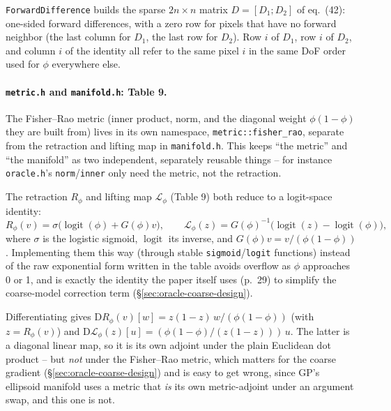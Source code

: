 \documentclass[11pt]{article}
\begin{document}
\texttt{ForwardDifference} builds the sparse $2n\times n$ matrix $D=[D_1;D_2]$ of eq.~(42):
one-sided forward differences, with a zero row for pixels that have no forward neighbor
(the last column for $D_1$, the last row for $D_2$). Row $i$ of $D_1$, row $i$ of $D_2$, and
column $i$ of the identity all refer to the same pixel $i$ in the same DoF order used for
$\phi$ everywhere else.

\paragraph{\texttt{metric.h} and \texttt{manifold.h}: Table 9.} The Fisher--Rao metric
(inner product, norm, and the diagonal weight $\phi(1-\phi)$ they are built from) lives in
its own namespace, \texttt{metric::fisher\_rao}, separate from the retraction and lifting
map in \texttt{manifold.h}. This keeps ``the metric'' and ``the manifold'' as two
independent, separately reusable things -- for instance \texttt{oracle.h}'s
\texttt{norm}/\texttt{inner} only need the metric, not the retraction.

The retraction $R_\phi$ and lifting map $\mathcal L_\phi$ (Table 9) both reduce to a
logit-space identity:
\[
  R_\phi(v) = \sigma\big(\operatorname{logit}(\phi) + G(\phi) v\big), \qquad
  \mathcal{L}_\phi(z) = G(\phi)^{-1}\big(\operatorname{logit}(z) - \operatorname{logit}(\phi)\big),
\]
where $\sigma$ is the logistic sigmoid, $\operatorname{logit}$ its inverse, and
$G(\phi)v=v/(\phi(1-\phi))$. Implementing them this way (through stable
\texttt{sigmoid}/\texttt{logit} functions) instead of the raw exponential form written in
the table avoids overflow as $\phi$ approaches 0 or 1, and is exactly the identity the
paper itself uses (p.~29) to simplify the coarse-model correction term (\S\ref{sec:oracle-coarse-design}).

Differentiating gives $\mathrm D R_\phi(v)[w] = z(1-z)\,w/(\phi(1-\phi))$ (with
$z=R_\phi(v)$) and $\mathrm D\mathcal L_\phi(z)[u] = (\phi(1-\phi)/(z(1-z)))\,u$. The latter
is a diagonal linear map, so it is its own adjoint under the plain Euclidean dot product --
but \emph{not} under the Fisher--Rao metric, which matters for the coarse gradient
(\S\ref{sec:oracle-coarse-design}) and is easy to get wrong, since GP's ellipsoid manifold
uses a metric that \emph{is} its own metric-adjoint under an argument swap, and this one is
not.
\end{document}
